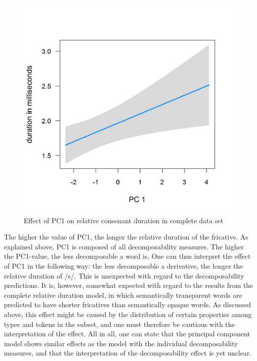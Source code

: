 \begin{figure} [b!]
	\centering
	\includegraphics [scale=0.4] {images/Corpus/disPCAbsPC4.png}
	\caption{Effect of PC1 on relative consonant duration in complete data set}
	\label{fig:PC1 dis Corpus}
\end{figure}


The higher the value of \textsc{PC1}, the longer the relative duration of the fricative. As explained above, \textsc{PC1} is composed of all decomposability measures. The higher the \textsc{PC1}-value, the less decomposable a word is.
 One can thus interpret the effect of \textsc{PC1} in the following way: the less decomposable a derivative, the longer the relative duration of /s/. This is unexpected with regard to the decomposability predictions. It is, however, somewhat expected with regard to the results from the complete relative duration model, in which semantically transparent words are predicted to have shorter fricatives than semantically opaque words. As discussed above, this effect might be caused by the distribution of certain properties among types and tokens in the subset, and one must therefore be cautious with the interpretation of the effect. All in all, one can state that the principal component model shows similar effects as the model with the individual decomposability measures, and that the interpretation of the decomposability effect is yet unclear.






